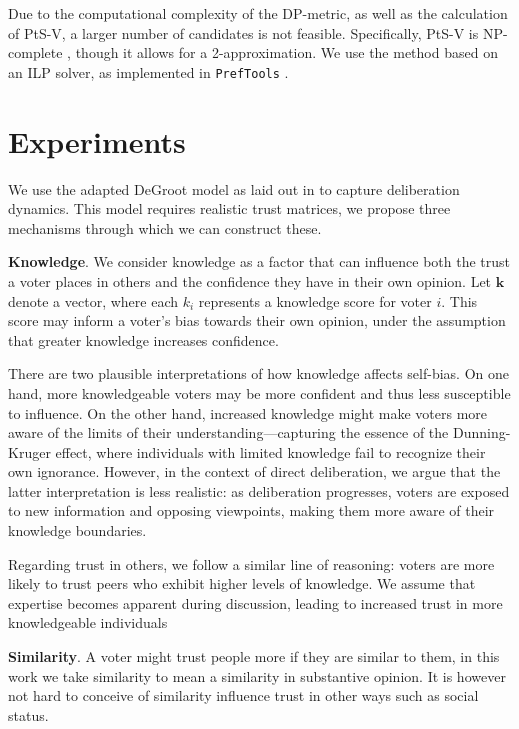 Due to the computational complexity of the
DP-metric, as well as the calculation of PtS-V, a larger number of candidates is not
feasible. Specifically, PtS-V is NP-complete
\cite{erdelyiComputationalAspectsNearly2013}, though it allows for a
2-approximation. We use the method based on an ILP solver, as implemented in
\texttt{PrefTools} \cite{PrefLibPreflibtools2025}.



\section{Experiments}
We use the adapted DeGroot model as laid out in  to capture deliberation dynamics. This model requires realistic trust matrices, we propose three mechanisms through which we can construct these.


\textbf{Knowledge}. We consider knowledge as a factor that can influence both the trust a voter places in others and the confidence they have in their own opinion. Let $\boldsymbol{k}$ denote a vector, where each $k_i$ represents a knowledge score for voter $i$. This score may inform a voter's bias towards their own opinion, under the assumption that greater knowledge increases confidence.

There are two plausible interpretations of how knowledge affects self-bias. On one hand, more knowledgeable voters may be more confident and thus less susceptible to influence. On the other hand, increased knowledge might make voters more aware of the limits of their understanding—capturing the essence of the Dunning-Kruger effect, where individuals with limited knowledge fail to recognize their own ignorance. However, in the context of direct deliberation, we argue that the latter interpretation is less realistic: as deliberation progresses, voters are exposed to new information and opposing viewpoints, making them more aware of their knowledge boundaries.

Regarding trust in others, we follow a similar line of reasoning: voters are
more likely to trust peers who exhibit higher levels of knowledge. We assume
that expertise becomes apparent during discussion, leading to increased
trust in more knowledgeable individuals


\textbf{Similarity}. A voter might trust people more if they are similar to them, in this work we take similarity to mean a similarity in substantive opinion. It is however not hard to conceive of similarity influence trust in other ways such as social status.


